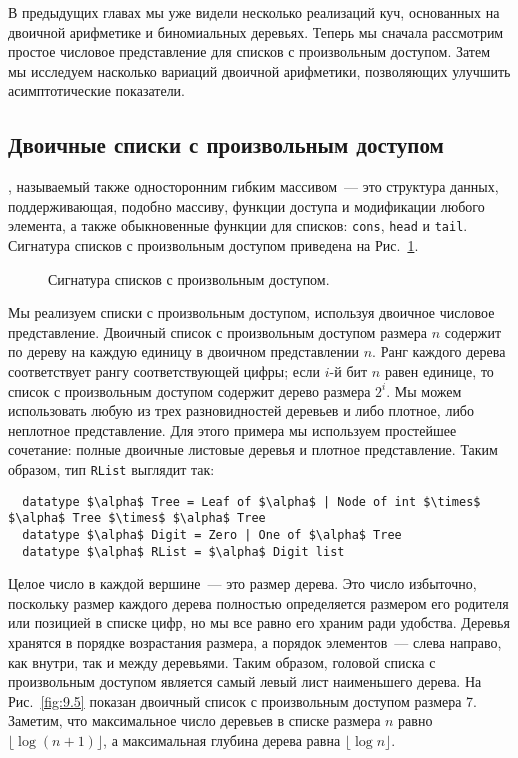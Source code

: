В предыдущих главах мы уже видели несколько реализаций куч,
основанных на двоичной арифметике и биномиальных деревьях. Теперь мы
сначала рассмотрим простое числовое представление для списков с
произвольным доступом. Затем мы исследуем насколько вариаций двоичной
арифметики, позволяющих улучшить асимптотические показатели.

\subsection{Двоичные списки с произвольным доступом}
\label{sc:9.2.1}

, называемый
также односторонним гибким массивом~--- это структура данных,
поддерживающая, подобно массиву, функции доступа и модификации любого
элемента, а также обыкновенные функции для списков: \lstinline!cons!,
\lstinline!head! и \lstinline!tail!. Сигнатура списков с произвольным
доступом приведена на Рис.~\ref{fig:9.4}.

\begin{figure}
  \centering
  
  \caption{Сигнатура списков с произвольным доступом.}
  \label{fig:9.4}
\end{figure}

Мы реализуем списки с произвольным доступом, используя двоичное
числовое представление. Двоичный список с произвольным доступом
размера $n$ содержит по дереву на каждую единицу в двоичном
представлении $n$. Ранг каждого дерева соответствует рангу
соответствующей цифры; если $i$-й бит $n$ равен единице, то список с
произвольным доступом содержит дерево размера $2^i$. Мы можем
использовать любую из трех разновидностей деревьев и либо плотное,
либо неплотное представление. Для этого примера мы используем
простейшее сочетание: полные двоичные листовые деревья и плотное
представление. Таким образом, тип \lstinline!RList! выглядит так:
\begin{lstlisting}
  datatype $\alpha$ Tree = Leaf of $\alpha$ | Node of int $\times$ $\alpha$ Tree $\times$ $\alpha$ Tree
  datatype $\alpha$ Digit = Zero | One of $\alpha$ Tree
  datatype $\alpha$ RList = $\alpha$ Digit list
\end{lstlisting}
Целое число в каждой вершине~--- это размер дерева. Это число
избыточно, поскольку размер каждого дерева полностью определяется
размером его родителя или позицией в списке цифр, но мы все равно его
храним ради удобства. Деревья хранятся в порядке возрастания размера,
а порядок элементов~--- слева направо, как внутри, так и между
деревьями. Таким образом, головой списка с произвольным доступом
является самый левый лист наименьшего дерева. На Рис.~\ref{fig:9.5}
показан двоичный список с произвольным доступом размера 7. Заметим,
что максимальное число деревьев в списке размера $n$ равно 
$\lfloor \log (n+1) \rfloor$, а максимальная глубина дерева равна 
$\lfloor \log n \rfloor$.

